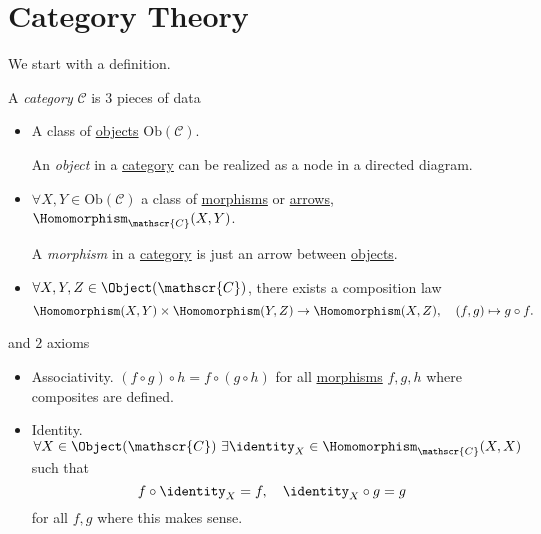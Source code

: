 \section{Category Theory}
We start with a definition.
\begin{definition}[Category]\label{def:category}
	A \emph{category} \(\mathscr{C} \) is \(3\) pieces of data
	\begin{itemize}
		\item A class of \hyperref[def:object]{objects} \(\mathrm{Ob}(\mathscr{C})\).
		      \begin{definition}[Object]\label{def:object}
			      An \emph{object} in a \hyperref[def:category]{category} can be realized as a node in a directed diagram.
		      \end{definition}
		\item \(\forall X, Y\in\mathrm{Ob} (\mathscr{C})\) a class of \hyperref[def:morphism]{morphisms} or \underline{arrows},
		      \(\Homomorphism_{\mathscr{C}}(X, Y)\).
		      \begin{definition}[Morphism]\label{def:morphism}
			      A \emph{morphism} in a \hyperref[def:category]{category} is just an arrow between \hyperref[def:object]{objects}.
		      \end{definition}
		\item \(\forall X, Y, Z\in \Object (\mathscr{C})\), there exists a composition law
		      \[
			      \Homomorphism (X, Y)\times \Homomorphism (Y, Z)\to \Homomorphism (X, Z),\quad (f, g)\mapsto g\circ f.
		      \]
	\end{itemize}
	and \(2\) axioms
	\begin{itemize}
		\item Associativity. \((f\circ g)\circ h = f\circ (g\circ h)\) for all \hyperref[def:morphism]{morphisms} \(f, g, h\)
		      where composites are defined.
		\item Identity. \(\forall X\in\Object (\mathscr{C})\ \exists \identity_{X}\in\Homomorphism _{\mathscr{C}} (X, X)\) such that
		      \[
			      f\circ \identity_{X} = f,\quad \identity_{X} \circ g = g
		      \]
		      for all \(f, g\) where this makes sense.
	\end{itemize}
\end{definition}

